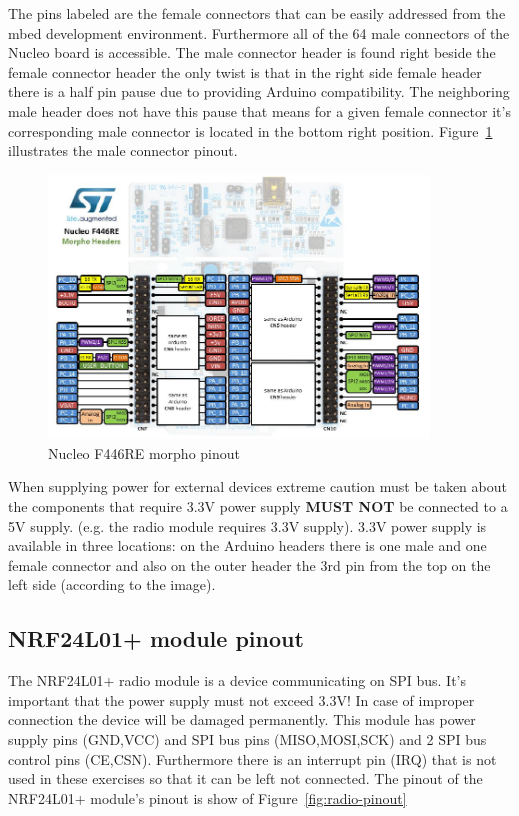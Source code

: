 \documentclass[a4paper]{article}
\begin{document}
The pins labeled are the female connectors that can be easily addressed from the mbed development environment.
Furthermore all of the 64 male connectors of the Nucleo board is accessible. The male connector header is found right
beside the female connector header the only twist is that in the right side female header there is a half pin pause due
to providing Arduino compatibility. The neighboring male header does not have this pause that means for a given female
connector it's corresponding male connector is located in the bottom right position.
Figure~\ref{fig:nucleo-pinout-morpho} illustrates the male connector pinout.

\begin{figure}[H]
    \centering
    \includegraphics[width=0.9\textwidth]{figures/nucleo-morpho-pinout.png}
    \caption{Nucleo F446RE morpho pinout}
    \label{fig:nucleo-pinout-morpho}
\end{figure}

When supplying power for external devices extreme caution must be taken about the components that require 3.3V power
supply \textbf{MUST NOT} be connected to a 5V supply. (e.g. the radio module requires 3.3V supply).
3.3V power supply is available in three locations: on the Arduino headers there is one male and one female connector
and also on the outer header the 3rd pin from the top on the left side (according to the image).

\subsection{NRF24L01+ module pinout}

The NRF24L01+ radio module is a device communicating on SPI bus. It's important that the power supply must not exceed
3.3V!
In case of improper connection the device will be damaged permanently.
This module has power supply pins (GND,VCC) and SPI bus pins (MISO,MOSI,SCK) and 2 SPI bus control pins (CE,CSN).
Furthermore there is an interrupt pin (IRQ) that is not used in these exercises so that it can be left not connected.
The pinout of the NRF24L01+ module's pinout is show of Figure~\ref{fig:radio-pinout}
\end{document}
